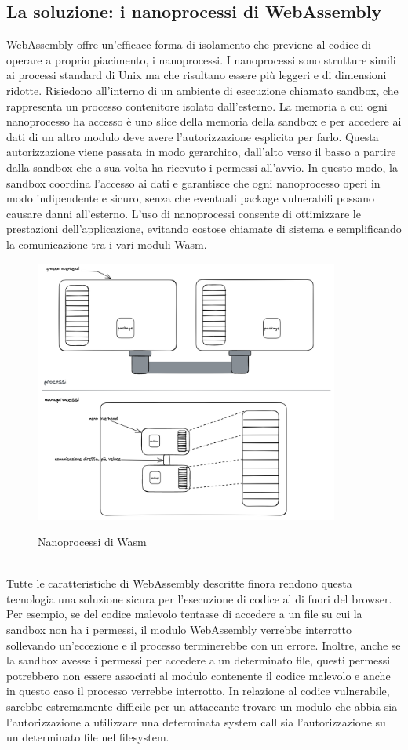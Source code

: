 \subsection{La soluzione: i nanoprocessi di WebAssembly}
WebAssembly offre un'efficace forma di isolamento che previene al codice di operare a proprio piacimento, i
nanoprocessi\cite{wasm-nano-processes}. I nanoprocessi sono strutture simili ai processi standard di Unix ma che
risultano essere più leggeri e di dimensioni ridotte. Risiedono all'interno di un ambiente di esecuzione chiamato
sandbox, che rappresenta un processo contenitore isolato dall'esterno. La memoria a cui ogni nanoprocesso ha accesso è
uno slice della memoria della  sandbox e per accedere ai dati di un altro modulo deve avere l'autorizzazione esplicita
per farlo. Questa autorizzazione viene passata in modo gerarchico, dall'alto verso il basso a partire dalla sandbox che
a sua volta ha ricevuto i permessi all'avvio. In questo modo, la sandbox coordina l'accesso ai dati e garantisce che
ogni nanoprocesso operi in modo indipendente e sicuro, senza che eventuali package vulnerabili possano causare danni
all'esterno. L'uso di nanoprocessi consente di ottimizzare le prestazioni dell'applicazione, evitando costose chiamate
di sistema e semplificando la comunicazione tra i vari moduli Wasm.
\begin{figure}[h]
    \centering
    \captionsetup{justification=centering}
    \includegraphics[width=10cm]{./chapters/2.wasi-in-depth/images/4.nanoprocesses.png}
    \label{nanoprocesses}
    \caption{Nanoprocessi di Wasm}
\end{figure}
\\
Tutte le caratteristiche di WebAssembly descritte finora rendono questa tecnologia una soluzione sicura per l'esecuzione
di codice al di fuori del browser. Per esempio, se del codice malevolo tentasse di accedere a un file su cui la sandbox
non ha i permessi, il modulo WebAssembly verrebbe interrotto sollevando un'eccezione e il processo terminerebbe con un
errore. Inoltre, anche se la sandbox avesse i permessi per accedere a un determinato file, questi permessi potrebbero
non essere associati al modulo contenente il codice malevolo e anche in questo caso il processo verrebbe interrotto. In
relazione al codice vulnerabile, sarebbe estremamente difficile per un attaccante trovare un modulo che abbia sia
l'autorizzazione a utilizzare una determinata system call sia l'autorizzazione su un determinato file nel filesystem.
